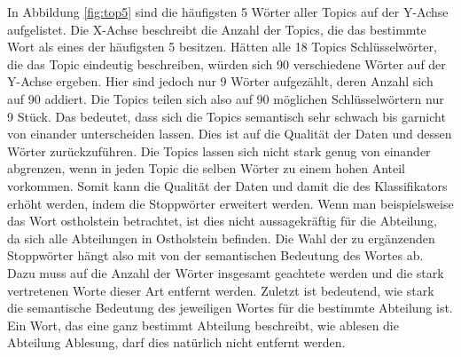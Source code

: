 \documentclass[german,version-2020-11]{uzl-thesis}
\begin{document}
\begin{itemize}
\begin{enumerate}
In Abbildung \ref{fig:top5} sind die häufigsten 5 Wörter aller Topics auf der Y-Achse aufgelistet. Die X-Achse beschreibt die Anzahl der Topics, die das bestimmte Wort als eines der häufigsten 5 besitzen. Hätten alle 18 Topics Schlüsselwörter, die das Topic eindeutig beschreiben, würden sich 90 verschiedene Wörter auf der Y-Achse ergeben. Hier sind jedoch nur 9 Wörter aufgezählt, deren Anzahl sich auf 90 addiert. Die Topics teilen sich also auf 90 möglichen Schlüsselwörtern nur 9 Stück. Das bedeutet, dass sich die Topics semantisch sehr schwach bis garnicht von einander unterscheiden lassen. Dies ist auf die Qualität der Daten und dessen Wörter zurückzuführen. Die Topics lassen sich nicht stark genug von einander abgrenzen, wenn in jeden Topic die selben Wörter zu einem hohen Anteil vorkommen. Somit kann die Qualität der Daten und damit die des Klassifikators erhöht werden, indem die Stoppwörter erweitert werden. Wenn man beispielsweise das Wort ostholstein betrachtet, ist dies nicht aussagekräftig für die Abteilung, da sich alle Abteilungen in Ostholstein befinden. Die Wahl der zu ergänzenden Stoppwörter hängt also mit von der semantischen Bedeutung des Wortes ab. Dazu muss auf die Anzahl der Wörter insgesamt geachtete werden und die stark vertretenen Worte dieser Art entfernt werden. Zuletzt ist bedeutend, wie stark die semantische Bedeutung des jeweiligen Wortes für die bestimmte Abteilung ist. Ein Wort, das eine ganz bestimmt Abteilung beschreibt, wie ablesen die Abteilung Ablesung, darf dies natürlich nicht entfernt werden. 
\\




\end{enumerate}
\end{itemize}
\end{document}
